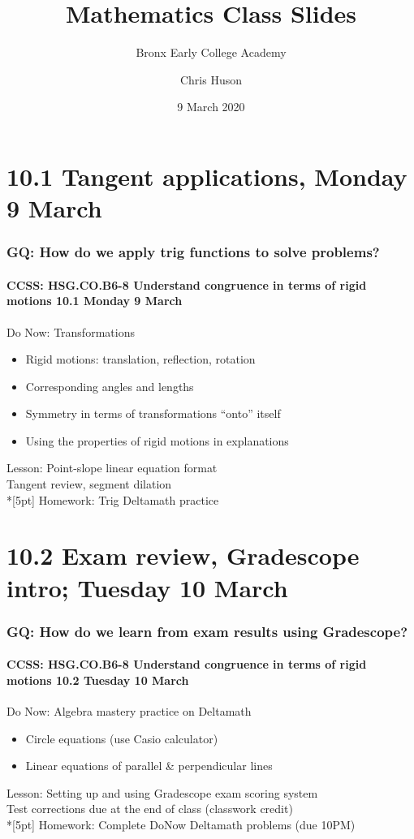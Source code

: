 \documentclass{beamer}
\title{Mathematics Class Slides}
\subtitle{Bronx Early College Academy}
\author{Chris Huson}
\date{9 March 2020}
\begin{document}
\frame{\titlepage}
\section[Outline]{}
\frame{\tableofcontents}

\section{10.1 Tangent applications, Monday 9 March} 
\frame
{
  \frametitle{GQ: How do we apply trig functions to solve problems?}
  \framesubtitle{CCSS: HSG.CO.B6-8 Understand congruence in terms of rigid motions \hfill \alert{10.1 Monday  9 March}}

  \begin{block}{Do Now: Transformations}
  \begin{itemize}
    \item Rigid motions: translation, reflection, rotation
    \item Corresponding angles and lengths
    \item Symmetry in terms of transformations ``onto'' itself
    \item Using the properties of rigid motions in explanations
  \end{itemize}
  \end{block}
  Lesson: Point-slope linear equation format \\
  Tangent review, segment dilation\\*[5pt]
  Homework: Trig Deltamath practice
}

\section{10.2 Exam review, Gradescope intro; Tuesday 10 March} 
\frame
{
  \frametitle{GQ: How do we learn from exam results using Gradescope?}
  \framesubtitle{CCSS: HSG.CO.B6-8 Understand congruence in terms of rigid motions \hfill \alert{10.2 Tuesday 10 March}}

  \begin{block}{Do Now: Algebra mastery practice on Deltamath}
    \begin{itemize}
      \item Circle equations (use Casio calculator)
      \item Linear equations of parallel \& perpendicular lines
    \end{itemize}
    \end{block}
    Lesson: Setting up and using Gradescope exam scoring system \\
    Test corrections due at the end of class (classwork credit)\\*[5pt]
    Homework: Complete DoNow Deltamath problems (due 10PM)
}
\end{document}
